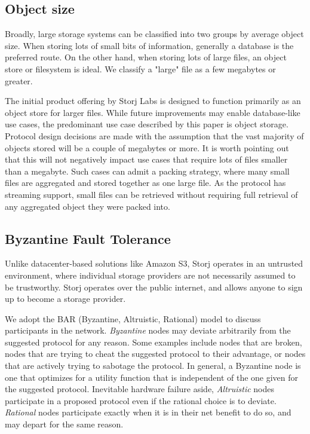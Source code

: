 \documentclass[a4paper,10pt]{article} \usepackage[utf8]{inputenc}
\begin{document}
\subsection{Object size}

Broadly, large storage systems can be classified into two groups by average
object size. When storing lots of small bits of information, generally a
database is the preferred route. On the other hand, when storing lots of large
files, an object store or filesystem is ideal. We classify a "large" file as a
few megabytes or greater.

The initial product offering by Storj Labs is designed to function primarily as
an object store for larger files. While future improvements may enable
database-like use cases, the predominant use case described by this paper is
object storage. Protocol design decisions are made with the assumption that the
vast majority of objects stored will be a couple of megabytes or more. It is
worth pointing out that this will not negatively impact use cases that require
lots of files smaller than a megabyte. Such cases can admit a packing
strategy, where many small files are aggregated and stored together as one large
file. As the protocol has streaming support, small files can be retrieved
without requiring full retrieval of any aggregated object they were packed into.

\subsection{Byzantine Fault Tolerance}

Unlike datacenter-based solutions like Amazon S3, Storj operates in an untrusted
environment, where individual storage providers are not necessarily assumed to be
trustworthy. Storj operates over the public internet, and allows anyone to sign
up to become a storage provider.

We adopt the BAR (Byzantine, Altruistic, Rational) model \cite{bar} to discuss
participants in the network.
{\em Byzantine} nodes may deviate arbitrarily from the suggested protocol for
any reason. Some examples include nodes that are broken, nodes that are
trying to cheat the suggested protocol to their advantage, or nodes that
are actively trying to sabotage the protocol. In general, a Byzantine node is
one that optimizes for a utility function that is independent of the one
given for the suggested protocol.
Inevitable hardware failure aside, {\em Altruistic} nodes
participate in a proposed protocol even if the rational choice is to deviate.
{\em Rational} nodes participate exactly when it is in their net benefit to do
so, and may depart for the same reason.
\end{document}
